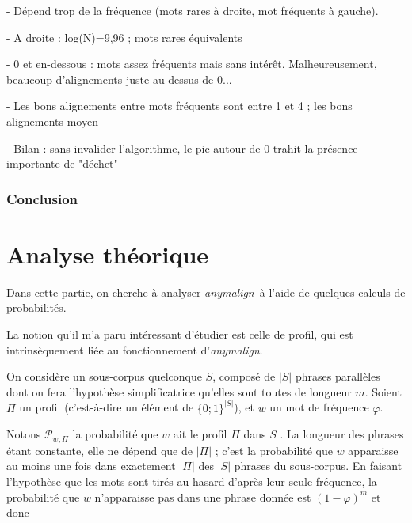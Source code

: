 \documentclass[a4paper,10pt]{article}
\newcommand{\anym}{\emph{anymalign}}
\begin{document}
- Dépend trop de la fréquence (mots rares à droite, mot fréquents à gauche).

- A droite : log(N)=9,96 ; mots rares équivalents %

- 0 et en-dessous : mots assez fréquents mais sans intérêt. Malheureusement, beaucoup d'alignements juste au-dessus de 0...

- Les bons alignements entre mots fréquents sont entre 1 et 4 ; les bons alignements moyen

- Bilan : sans invalider l'algorithme, le pic autour de 0 trahit la présence importante de "déchet"



\subsubsection{Conclusion}



\section{Analyse théorique}

Dans cette partie, on cherche à analyser \anym~à l'aide de quelques calculs de probabilités.

La notion qu'il m'a paru intéressant d'étudier est celle de profil, qui est intrinsèquement liée au fonctionnement d'\anym.

On considère un sous-corpus quelconque $S$, composé de $|S|$ phrases parallèles dont on fera l'hypothèse simplificatrice qu'elles sont toutes de longueur $m$. Soient $\Pi$ un profil (c'est-à-dire un élément de $\{0;1\}^{|S|}$), et $w$ un mot de fréquence $\varphi$.

Notons $\mathcal{P}_{w,\Pi}$ la probabilité que $w$ ait le profil $\Pi$ dans $S$
. La longueur des phrases étant constante, elle ne dépend que de $|\Pi|$ ; c'est la probabilité que $w$ apparaisse au moins une fois dans exactement $|\Pi|$ des $|S|$ phrases du sous-corpus. En faisant l'hypothèse que les mots sont tirés au hasard d'après leur seule fréquence, la probabilité que $w$ n'apparaisse pas dans une phrase donnée est $(1-\varphi)^m$ et donc
\end{document}

